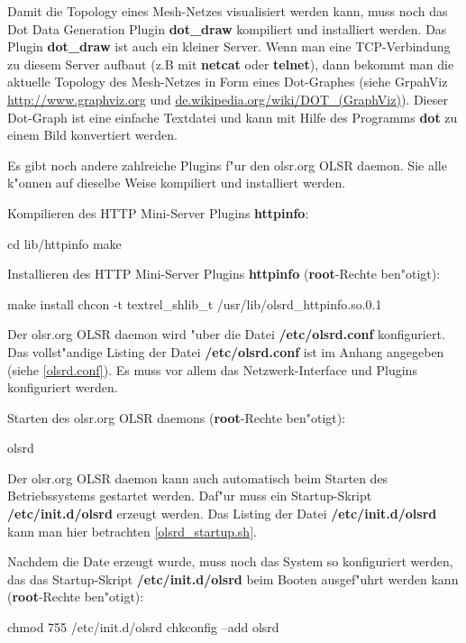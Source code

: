 Damit die Topology eines Mesh-Netzes visualisiert werden kann,
muss noch das Dot Data Generation Plugin \textbf{dot\_draw}
kompiliert und installiert werden. Das Plugin \textbf{dot\_draw}
ist auch ein kleiner Server. Wenn man eine TCP-Verbindung zu diesem Server
aufbaut (z.B mit \textbf{netcat} oder \textbf{telnet}),
dann bekommt man die aktuelle Topology des Mesh-Netzes in
Form eines Dot-Graphes
(siehe GrpahViz \url{http://www.graphviz.org} und
 \url{de.wikipedia.org/wiki/DOT\_(GraphViz)}).
Dieser Dot-Graph ist eine einfache Textdatei und kann mit Hilfe des
Programms \textbf{dot} zu einem Bild konvertiert werden.

Es gibt noch andere zahlreiche Plugins f"ur
den olsr.org OLSR daemon. Sie alle k"onnen auf dieselbe Weise kompiliert
und installiert werden.

Kompilieren des HTTP Mini-Server Plugins \textbf{httpinfo}:
\begin{shelllst}
cd lib/httpinfo
make
\end{shelllst}

Installieren des HTTP Mini-Server Plugins \textbf{httpinfo}
(\textbf{root}-Rechte ben"otigt):
\begin{shelllst}
make install 
chcon -t textrel_shlib_t /usr/lib/olsrd_httpinfo.so.0.1
\end{shelllst}

Der olsr.org OLSR daemon wird "uber die Datei \textbf{/etc/olsrd.conf}
konfiguriert.  Das vollst"andige Listing der Datei \textbf{/etc/olsrd.conf} ist
im Anhang angegeben (siehe \ref{olsrd.conf}).
Es muss vor allem das Netzwerk-Interface und Plugins konfiguriert werden.

Starten des olsr.org OLSR daemons
(\textbf{root}-Rechte ben"otigt):
\begin{shelllst}
olsrd
\end{shelllst}

Der olsr.org OLSR daemon kann auch automatisch beim Starten
des Betriebssystems gestartet werden. Daf"ur muss ein Startup-Skript
\textbf{/etc/init.d/olsrd} erzeugt werden. Das Listing der Datei
\textbf{/etc/init.d/olsrd} kann man hier betrachten \ref{olsrd_startup.sh}.

Nachdem die Date erzeugt wurde, muss noch das System so konfiguriert
werden, das das Startup-Skript \textbf{/etc/init.d/olsrd} beim Booten
ausgef"uhrt werden kann (\textbf{root}-Rechte ben"otigt):
\begin{shelllst}
chmod 755 /etc/init.d/olsrd
chkconfig --add olsrd
\end{shelllst}


